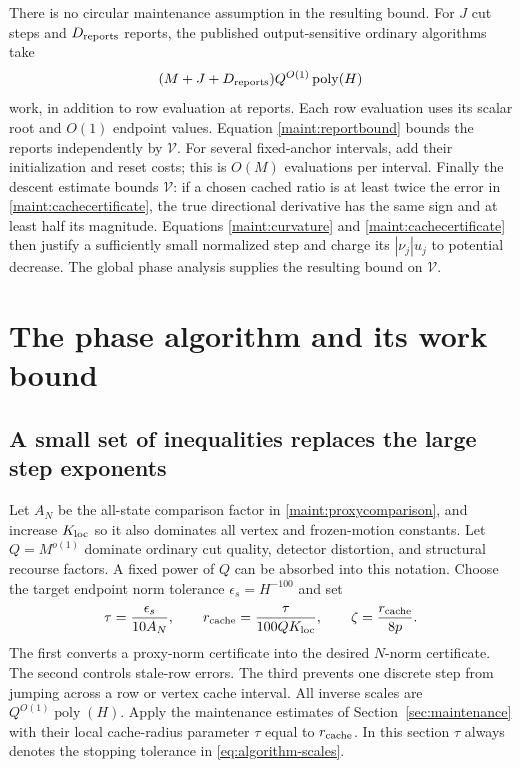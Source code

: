 \documentclass[11pt]{article}
\theoremstyle{definition}\newtheorem{definition}[theorem]{Definition}
\theoremstyle{remark}\newtheorem{remark}[theorem]{Remark}
\newcommand{\poly}{\operatorname{poly}}
\begin{document}
There is no circular maintenance assumption in the resulting bound.
For $J$ cut steps and $D_{\rm reports}$ reports, the published
output-sensitive ordinary algorithms take
\[
 (M+J+D_{\rm reports})Q^{O(1)}\operatorname{poly}(H)
\]
work, in addition to row evaluation at reports. Each row evaluation
uses its scalar root and $O(1)$ endpoint values. Equation
\eqref{maint:reportbound} bounds the reports independently by $\mathcal V$.
For several fixed-anchor intervals, add their initialization and reset
costs; this is $O(M)$ evaluations per interval.
Finally the descent estimate bounds $\mathcal V$: if a chosen cached ratio is
at least twice the error in
\eqref{maint:cachecertificate}, the true directional derivative has the
same sign and at least half its magnitude. Equations
\eqref{maint:curvature} and \eqref{maint:cachecertificate} then justify
a sufficiently small normalized step and charge its $|\nu_j|u_j$ to
potential decrease. The global phase analysis supplies the resulting
bound on $\mathcal V$.



\section{The phase algorithm and its work bound}\label{sec:descent}

\subsection{A small set of inequalities replaces the large step exponents}

Let $A_N$ be the all-state comparison factor in
\eqref{maint:proxycomparison}, and increase $K_{\rm loc}$ so it also
dominates all vertex and frozen-motion constants. Let $Q=M^{o(1)}$
dominate ordinary cut quality, detector distortion, and structural
recourse factors. A fixed power of $Q$ can be absorbed into this notation.
Choose the target endpoint norm tolerance $\epsilon_s=H^{-100}$ and set
\begin{equation}\label{eq:algorithm-scales}
 \tau=\frac{\epsilon_s}{10A_N},\qquad
 r_{\rm cache}=\frac{\tau}{100QK_{\rm loc}},\qquad
 \zeta=\frac{r_{\rm cache}}{8p}.
\end{equation}
The first converts a proxy-norm certificate into the desired $N$-norm
certificate. The second controls stale-row errors. The third prevents
one discrete step from jumping across a row or vertex cache interval.
All inverse scales are $Q^{O(1)}\poly(H)$.
Apply the maintenance estimates of Section~\ref{sec:maintenance} with
their local cache-radius parameter $\tau$ equal to $r_{\rm cache}$.
In this section $\tau$ always denotes the stopping tolerance in
\eqref{eq:algorithm-scales}.
\end{document}
